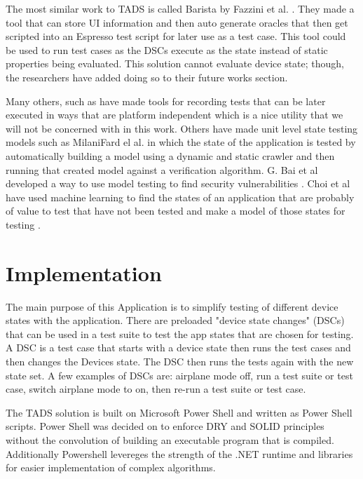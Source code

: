The most similar work to TADS is called Barista by Fazzini et al. \cite{7927971}.  They made a tool that can store UI information and then auto generate oracles that then get scripted into an Espresso test script for later use as a test case.  This tool could be used to run test cases as the DSCs execute as the state instead of static properties being evaluated. This solution cannot evaluate device state; though, the researchers have added doing so to their future works section.   

Many others, such as \cite{7927971} have made tools for recording tests that can be later executed in ways that are platform independent which is a nice utility that we will not be concerned with in this work.  Others have made unit level state testing models such as MilaniFard el al. \cite{MilaniFard:2014:LET:2642937.2642991} in which the state of the application is tested by automatically building a model using a dynamic and static crawler and then running that created model against a verification algorithm.  G. Bai et al developed a way to use model testing to find security vulnerabilities \cite{7911333}.  Choi et al have used machine learning to find the states of an application that are probably of value to test that have not been tested and make a model of those states for testing \cite{Choi:2013:GGT:2544173.2509552}.


\section{Implementation}
The main purpose of this Application is to simplify testing of different device states with the application.  There are preloaded "device state changes" (DSCs) that can be used in a test suite to test the app states that are chosen for testing.  A DSC is a test case that starts with a device state then runs the test cases and then changes the Devices state.  The DSC then runs the tests again with the new state set.  A few examples of DSCs are: airplane mode off, run a test suite or test case, switch airplane mode to on, then re-run a test suite or test case.

The TADS solution is built on Microsoft Power Shell and written as Power Shell scripts.  Power Shell was decided on to enforce DRY and SOLID principles without the convolution of building an executable program that is compiled.  Additionally Powershell levereges the strength of the .NET runtime and libraries for easier implementation of complex algorithms.    

